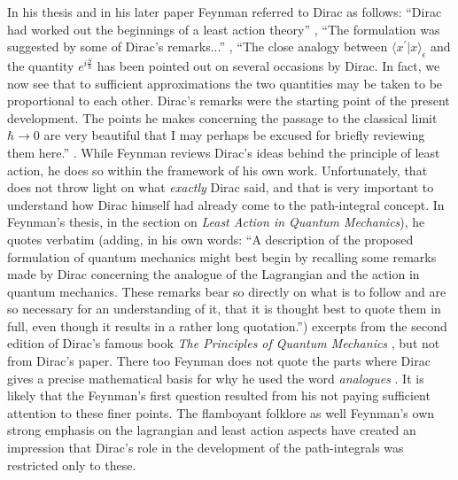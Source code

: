 \documentclass[12pt]{article}
\begin{document}
In his thesis \cite{thesis} and in his later paper \cite{feynpaper} Feynman referred to Dirac as follows: ``Dirac had worked out the beginnings
of a least action theory'' \cite{thesis}, ``The formulation was suggested by some of Dirac's remarks...'' \cite{feynpaper}, ``The close analogy
between $\langle x^\prime|x\rangle_{\epsilon}$ and the quantity $e^{i\frac{S}{\hbar}}$ has been pointed out on several occasions by Dirac. In
fact, we now see that to sufficient approximations the two quantities may be taken to be proportional to each other. Dirac's remarks were the starting point of the present development. The points he makes concerning the passage to the classical limit $\hbar \rightarrow 0$ are very
beautiful that I may perhaps be excused for briefly reviewing them here.'' \cite{feynpaper}. While Feynman reviews Dirac's ideas behind the principle
of least action, he does so within the framework of his own work. Unfortunately, that does not throw light on what {\it exactly} Dirac said, and
that is very important to understand how Dirac himself had already come to the path-integral concept. In Feynman's thesis, in the section on {\it Least Action in Quantum Mechanics}), he quotes verbatim (adding, in his own words:
``A description of the proposed formulation of quantum mechanics
might best begin by recalling some remarks made by Dirac concerning
the analogue of the Lagrangian and the action in quantum
mechanics. These remarks bear so directly on what is to follow and
are so necessary for an understanding of it, that it is thought best to
quote them in full, even though it results in a rather long quotation.'')
excerpts from the second edition of Dirac's famous book {\it The Principles of Quantum Mechanics} \cite{diracbook2}, but not from Dirac's paper.
There too Feynman  does not quote the parts where Dirac gives a precise mathematical basis for why he used the word \emph{analogues} . 
It is likely that the Feynman's first question resulted from  his not paying sufficient attention to these finer points. The flamboyant
folklore as well Feynman's own strong emphasis on the lagrangian and least action aspects have created an impression that Dirac's role in the 
development of the path-integrals was restricted only to these.
\end{document}
